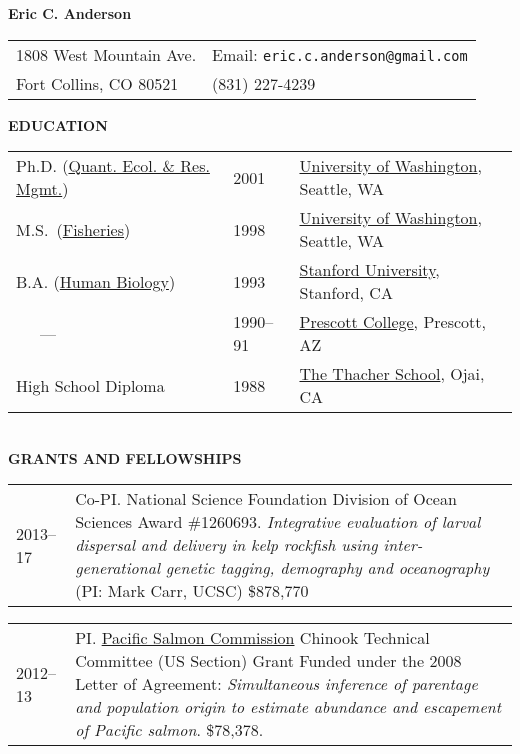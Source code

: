 \documentclass[11pt]{article}
\newlength{\myindent}
\newlength{\postskip}
\newlength{\preskip}
\newlength{\scndcol}
\begin{document}
\begin{center} \LARGE {\bf Eric C. Anderson}\\
\end{center} 
\begin{tabular*}{\textwidth}{@{\extracolsep{\fill}}ll@{}} 
1808 West Mountain Ave.       
&
Email: \texttt{eric.c.anderson@gmail.com}
\\ 
Fort Collins, CO 80521 &         
(831) 227-4239
\end{tabular*}
\vspace*{\postskip}
\nopagebreak

{\bf EDUCATION}
\vspace*{\preskip}\\
\begin{tabular}{@{\hspace{\myindent}}lll   }  Ph.D. (\href{http://depts.washington.edu/qerm/}{Quant. Ecol. \& Res.
Mgmt.})  &  2001   &   \href{http://www.washington.edu/}{University of Washington}, Seattle, WA
\\ M.S.~(\href{http://www.fish.washington.edu/}{Fisheries})         &    1998 & 
\href{http://www.washington.edu/}{University of Washington}, Seattle, WA
\\
B.A. (\href{http://www.stanford.edu/dept/humbio/}{Human Biology})   &  
1993 &
\href{http://www.stanford.edu/}{Stanford University}, Stanford, 
CA
\\
~~~---~~~  &  1990--91  & \href{http://www.prescott.edu/}{Prescott College}, Prescott, AZ  \\
High School Diploma  &  1988  &  \href{http://www.thacher.org/}{The Thacher School}, Ojai, CA
\end{tabular} 
\vspace*{\postskip}\\

{\bf GRANTS AND FELLOWSHIPS}
\vspace*{\preskip}\\
\begin{tabular}{ @{}p{2.5\myindent} p{\scndcol}@{}  }
\hspace*{\myindent}2013--17 &  Co-PI. National Science Foundation Division of Ocean Sciences Award \#1260693. {\em Integrative evaluation of larval dispersal and delivery in kelp rockfish using inter-generational genetic tagging, demography and oceanography} (PI: Mark Carr, UCSC)    \$878,770\\
\end{tabular}

\begin{tabular}{ @{}p{2.5\myindent} p{\scndcol}@{}  }
\hspace*{\myindent}2012--13 &  PI. \href{http://www.psc.org/}{Pacific Salmon Commission} Chinook Technical Committee (US Section) Grant Funded under the 2008 Letter of Agreement: {\em Simultaneous inference of parentage and population origin to estimate abundance and escapement of Pacific salmon}.   \$78,378.\\
\end{tabular}
\end{document}
